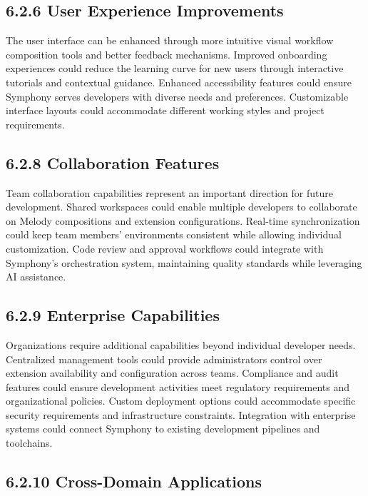 \subsection*{6.2.6 User Experience Improvements}

The user interface can be enhanced through more intuitive visual workflow composition tools and better feedback mechanisms. Improved onboarding experiences could reduce the learning curve for new users through interactive tutorials and contextual guidance. Enhanced accessibility features could ensure Symphony serves developers with diverse needs and preferences. Customizable interface layouts could accommodate different working styles and project requirements.

\subsection*{6.2.8 Collaboration Features}

Team collaboration capabilities represent an important direction for future development. Shared workspaces could enable multiple developers to collaborate on Melody compositions and extension configurations. Real-time synchronization could keep team members' environments consistent while allowing individual customization. Code review and approval workflows could integrate with Symphony's orchestration system, maintaining quality standards while leveraging AI assistance.

\subsection*{6.2.9 Enterprise Capabilities}

Organizations require additional capabilities beyond individual developer needs. Centralized management tools could provide administrators control over extension availability and configuration across teams. Compliance and audit features could ensure development activities meet regulatory requirements and organizational policies. Custom deployment options could accommodate specific security requirements and infrastructure constraints. Integration with enterprise systems could connect Symphony to existing development pipelines and toolchains.

\subsection*{6.2.10 Cross-Domain Applications}

